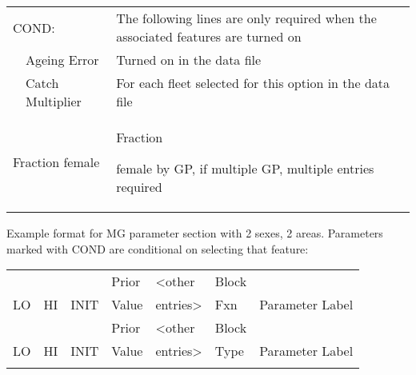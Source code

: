 \begin{center}
\begin{longtable}{p{1cm} p{2.5cm} p{10cm}}
		\hline
		\multicolumn{2}{l}{COND:} & The following lines are only required when the associated features are turned on\\
		& Ageing Error & Turned on in the data file\\
		& Catch Multiplier & For each fleet selected for this option in the data file\\
		\hline
		\multicolumn{2}{l}{Fraction female} & \hypertarget{SexRatio}{Fraction} female by GP, if multiple GP, multiple entries required\\
		\hline
	\end{longtable}
\end{center}
\pagebreak
		Example format for MG parameter section with 2 sexes, 2 areas.
		Parameters marked with COND are conditional on selecting that feature:
\begin{center}
	\begin{longtable}{p{1.1cm} p{1.1cm} p{1.1cm}  p{1.1cm}  p{1.1cm}  p{1.1cm}  p{8cm}  }
		\hline
		   &    &      & Prior &  <other & Block &  \\
		LO & HI & INIT & Value &  entries> & Fxn & Parameter Label \\
		\hline
		\endfirsthead

		\hline
		   &    &      & Prior &  <other & Block &  \\
		LO & HI & INIT & Value &  entries> & Type & Parameter Label \\
		\hline
		\endhead

		\endfoot

		\endlastfoot


\end{longtable}
\end{center}
